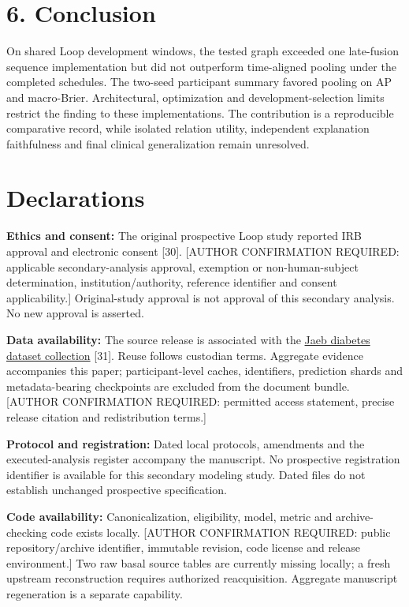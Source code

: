 \documentclass[11pt,a4paper]{article}
\begin{document}
\section*{6. Conclusion}
On shared Loop development windows, the tested graph exceeded one late-fusion sequence implementation but did not outperform time-aligned pooling under the completed schedules. The two-seed participant summary favored pooling on AP and macro-Brier. Architectural, optimization and development-selection limits restrict the finding to these implementations. The contribution is a reproducible comparative record, while isolated relation utility, independent explanation faithfulness and final clinical generalization remain unresolved.

\section*{Declarations}
\textbf{Ethics and consent:} The original prospective Loop study reported IRB approval and electronic consent [30]. [AUTHOR CONFIRMATION REQUIRED: applicable secondary-analysis approval, exemption or non-human-subject determination, institution/authority, reference identifier and consent applicability.] Original-study approval is not approval of this secondary analysis. No new approval is asserted.

\textbf{Data availability:} The source release is associated with the \href{https://public.jaeb.org/datasets/diabetes}{Jaeb diabetes dataset collection} [31]. Reuse follows custodian terms. Aggregate evidence accompanies this paper; participant-level caches, identifiers, prediction shards and metadata-bearing checkpoints are excluded from the document bundle. [AUTHOR CONFIRMATION REQUIRED: permitted access statement, precise release citation and redistribution terms.]

\textbf{Protocol and registration:} Dated local protocols, amendments and the executed-analysis register accompany the manuscript. No prospective registration identifier is available for this secondary modeling study. Dated files do not establish unchanged prospective specification.

\textbf{Code availability:} Canonicalization, eligibility, model, metric and archive-checking code exists locally. [AUTHOR CONFIRMATION REQUIRED: public repository/archive identifier, immutable revision, code license and release environment.] Two raw basal source tables are currently missing locally; a fresh upstream reconstruction requires authorized reacquisition. Aggregate manuscript regeneration is a separate capability.
\end{document}
